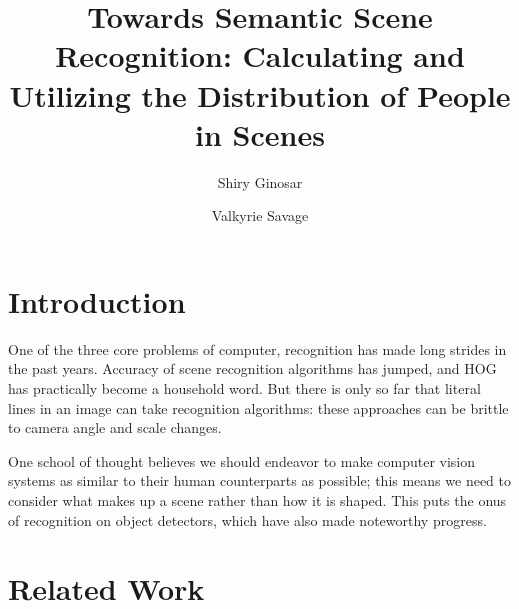 \documentclass[11pt]{article}
\begin{document}
\title{Towards Semantic Scene Recognition: Calculating and Utilizing the Distribution of People in Scenes}
\author{Shiry Ginosar \and Valkyrie Savage}

\maketitle


\section{Introduction}
One of the three core problems of computer, recognition has made long strides in the past years.  Accuracy of scene recognition algorithms has jumped, and HOG has practically become a household word.  But there is only so far that literal lines in an image can take recognition algorithms: these approaches can be brittle to camera angle and scale changes.

One school of thought believes we should endeavor to make computer vision systems as similar to their human counterparts as possible; this means we need to consider what makes up a scene rather than how it is shaped.  This puts the onus of recognition on object detectors, which have also made noteworthy progress.

\section{Related Work}
\end{document}
